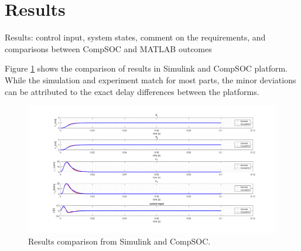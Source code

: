 \section{Results}


\color{red}
Results:	control	input,	system	states,	comment	on	the	requirements,	and	comparisons	
between	CompSOC and	MATLAB	outcomes
\color{black}

Figure \ref{fig:finalresult} shows the comparison of results in Simulink and CompSOC platform. While the simulation and experiment match for most parts, the minor deviations can be attributed to the exact delay differences between the platforms.
\begin{figure}[h]
	\begin{center}
		\includegraphics[width=\linewidth]{img/finalresult}
		\caption{Results comparison from Simulink and CompSOC.}
		\label{fig:finalresult}
	\end{center}
\end{figure}
